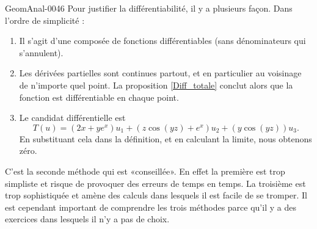 \begin{corrige}{GeomAnal-0046}
        Pour justifier la différentiabilité, il y a plusieurs façon. Dans l'ordre de simplicité :
        \begin{enumerate}
            \item
                Il s'agit d'une composée de fonctions différentiables (sans dénominateurs qui s'annulent).
            \item
                Les dérivées partielles sont continues partout, et en particulier au voisinage de n'importe quel point. La proposition \ref{Diff_totale} conclut alors que la fonction est différentiable en chaque point.
            \item
                Le candidat différentielle est
                \begin{equation}
                    T(u)=(2x+ye^x)u_1+(z\cos(yz)+e^x)u_2+(y\cos(yz))u_3.
                \end{equation}
                En substituant cela dans la définition, et en calculant la limite, nous obtenons zéro.
        \end{enumerate}
        C'est la seconde méthode qui est «conseillée». En effet la première est trop simpliste et risque de provoquer des erreurs de temps en temps. La troisième est trop sophistiquée et amène des calculs dans lesquels il est facile de se tromper. Il est cependant important de comprendre les trois méthodes parce qu'il y a des exercices dans lesquels il n'y a pas de choix.
\end{corrige}
